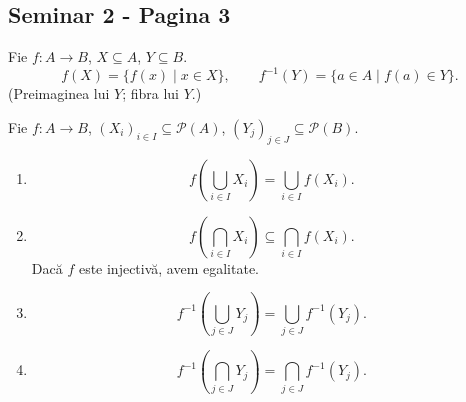 
\subsection*{Seminar 2 - Pagina 3}

\noindent{}\quad Fie $f:A\longrightarrow B$, $X\subseteq A$, $Y\subseteq B$.
\[
 f(X)=\{f(x)\mid x\in X\}, \qquad
 f^{-1}(Y)=\{a\in A\mid f(a)\in Y\}.
\]
\noindent (Preimaginea lui $Y$; fibra lui $Y$.)

\medskip
\noindent Fie $f:A\longrightarrow B$,
$(X_i)_{i\in I}\subseteq\mathcal{P}(A)$,
$(Y_j)_{j\in J}\subseteq\mathcal{P}(B)$.
\begin{enumerate}
\item[a)]
\[
 f\left(\bigcup_{i\in I}X_i\right)
  =\bigcup_{i\in I}f(X_i).
\]
\item[b)]
\[
 f\left(\bigcap_{i\in I}X_i\right)
  \subseteq\bigcap_{i\in I}f(X_i).
\]
\noindent Dacă $f$ este injectivă, avem egalitate.
\item[c)]
\[
 f^{-1}\left(\bigcup_{j\in J}Y_j\right)
  =\bigcup_{j\in J}f^{-1}(Y_j).
\]
\item[d)]
\[
 f^{-1}\left(\bigcap_{j\in J}Y_j\right)
  =\bigcap_{j\in J}f^{-1}(Y_j).
\]
\end{enumerate}

